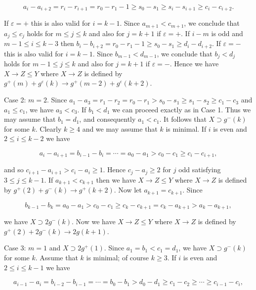 \documentclass[10pt]{article}
\begin{document}
$$
a_{i}-a_{i+2}=r_{i}-r_{i+1}=r_{0}-r_{1}-1 \geqslant s_{0}-s_{1} \geqslant s_{i}-s_{i+1} \geqslant c_{i}-c_{i+2} .
$$

If $\varepsilon=+$ this is also valid for $i=k-1$. Since $a_{m+1}<c_{m+1}$, we conclude that $a_{j} \leqslant c_{j}$ holds for $m \leqslant j \leqslant k$ and also for $j=k+1$ if $\varepsilon=+$. If $i-m$ is odd and $m-1 \leqslant i \leqslant k-3$ then $b_{i}-b_{i+2}=r_{0}-r_{1}-1 \geqslant s_{0}-s_{1} \geqslant d_{i}-d_{i+2}$. If $\varepsilon=-$ this is also valid for $i=k-1$. Since $b_{m-1}<d_{m-1}$, we conclude that $b_{j}<d_{j}$ holds for $m-1 \leqslant j \leqslant k$ and also for $j=k+1$ if $\varepsilon=-$. Hence we have $X \rightarrow Z \leqslant Y$ where $X \rightarrow Z$ is defined by $g^{+}(m)+g^{\varepsilon}(k) \rightarrow g^{+}(m-2)+g^{\varepsilon}(k+2)$.

Case 2: $m=2$. Since $a_{1}-a_{3}=r_{1}-r_{2}=r_{0}-r_{1}>s_{0}-s_{1} \geqslant s_{1}-s_{2} \geqslant c_{1}-c_{3}$ and $a_{1} \leqslant c_{1}$, we have $a_{3}<c_{3}$. If $b_{1}<d_{1}$ we can proceed exactly as in Case 1. Thus we may assume that $b_{1}=d_{1}$, and consequently $a_{1}<c_{1}$. It follows that $X \supset g^{-}(k)$ for some $k$. Clearly $k \geqslant 4$ and we may assume that $k$ is minimal. If $i$ is even and $2 \leqslant i \leqslant k-2$ we have

$$
a_{i}-a_{i+1}=b_{i-1}-b_{i}=\cdots=a_{0}-a_{1}>c_{0}-c_{1} \geqslant c_{i}-c_{i+1},
$$

and so $c_{i+1}-a_{i+1}>c_{i}-a_{i} \geqslant 1$. Hence $c_{j}-a_{j} \geqslant 2$ for $j$ odd satisfying $3 \leqslant j \leqslant k-1$. If $a_{k+1}<c_{k+1}$ then we have $X \rightarrow Z \leqslant Y$ where $X \rightarrow Z$ is defined by $g^{+}(2)+g^{-}(k) \rightarrow g^{+}(k+2)$. Now let $a_{k+1}=c_{k+1}$. Since

$$
b_{k-1}-b_{k}=a_{0}-a_{1}>c_{0}-c_{1} \geqslant c_{k}-c_{k+1}=c_{k}-a_{k+1}>a_{k}-a_{k+1},
$$

we have $X \supset 2 g^{-}(k)$. Now we have $X \rightarrow Z \leqslant Y$ where $X \rightarrow Z$ is defined by $g^{+}(2)+2 g^{-}(k) \rightarrow 2 g(k+1)$.

Case 3: $m=1$ and $X \supset 2 g^{+}(1)$. Since $a_{1}=b_{1}<c_{1}=d_{1}$, we have $X \supset g^{-}(k)$ for some $k$. Assume that $k$ is minimal; of course $k \geqslant 3$. If $i$ is even and $2 \leqslant i \leqslant k-1$ we have

$$
a_{i-1}-a_{i}=b_{i-2}-b_{i-1}=\cdots=b_{0}-b_{1}>d_{0}-d_{1} \geqslant c_{1}-c_{2} \geqslant \cdots \geqslant c_{i-1}-c_{i},
$$
\end{document}
